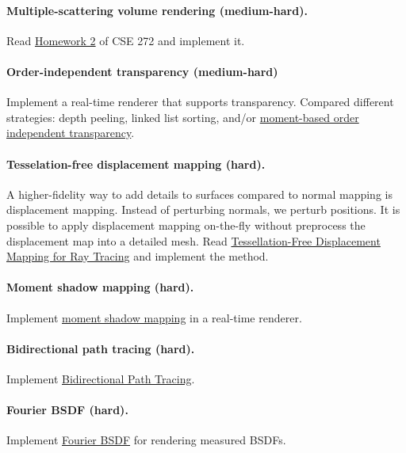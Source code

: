\paragraph{Multiple-scattering volume rendering (medium-hard).}
Read \href{https://cseweb.ucsd.edu/~tzli/cse272/wi2023/homework2.pdf}{Homework 2} of CSE 272 and implement it.

\paragraph{Order-independent transparency (medium-hard)}
Implement a real-time renderer that supports transparency. Compared different strategies: depth peeling, linked list sorting, and/or \href{https://momentsingraphics.de/I3D2018.html}{moment-based order independent transparency}.

\paragraph{Tesselation-free displacement mapping (hard).}
A higher-fidelity way to add details to surfaces compared to normal mapping is displacement mapping. Instead of perturbing normals, we perturb positions. It is possible to apply displacement mapping on-the-fly without preprocess the displacement map into a detailed mesh. Read \href{https://perso.telecom-paristech.fr/boubek/papers/TFDM/}{Tessellation-Free Displacement Mapping for Ray Tracing} and implement the method.

\paragraph{Moment shadow mapping (hard).}
Implement \href{https://momentsingraphics.de/I3D2015.html}{moment shadow mapping} in a real-time renderer.

\paragraph{Bidirectional path tracing (hard).}
Implement \href{https://www.pbr-book.org/3ed-2018/Light_Transport_III_Bidirectional_Methods/Bidirectional_Path_Tracing}{Bidirectional Path Tracing}.

\paragraph{Fourier BSDF (hard).}
Implement \href{https://www.pbr-book.org/3ed-2018/Reflection_Models/Fourier_Basis_BSDFs}{Fourier BSDF} for rendering measured BSDFs.

